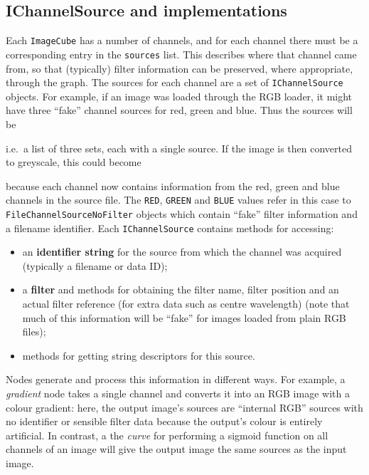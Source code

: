 \subsection{IChannelSource and implementations}
Each \texttt{ImageCube} has a number of channels, and for each channel there must be a corresponding
entry in the \texttt{sources} list. This describes where that channel came from, so that (typically) filter
information can be preserved, where appropriate, through the graph. The sources for each channel are a set
of \texttt{IChannelSource} objects. For example, if an image was loaded through the RGB loader, it might
have three ``fake'' channel sources for red, green and blue. Thus the sources will be 
\begin{v}
\end{v}
i.e.\ a list of three sets, each with a single source.
If the image is then converted to greyscale, this could
become
\begin{v}
\end{v}
because each channel now contains information from the red, green and blue channels in the source file.
The \texttt{RED}, \texttt{GREEN} and \texttt{BLUE} values refer in this case to \texttt{FileChannelSourceNoFilter} objects
which contain ``fake'' filter information and a filename identifier.
Each \texttt{IChannelSource} contains methods for accessing:
\begin{itemize}
\item an \textbf{identifier string} for the source from which the channel was acquired (typically a filename or data ID);
\item a \textbf{filter} and methods for obtaining the filter name, filter position and an actual filter reference (for extra data such as centre wavelength) (note
that much of this information will be ``fake'' for images loaded from plain RGB files);
\item methods for getting string descriptors for this source.
\end{itemize}

Nodes generate and process this information in different ways. For example, a \emph{gradient} node takes a single channel and converts it into an RGB image with
a colour gradient: here, the output image's sources are ``internal RGB'' sources with no identifier or sensible filter data because the output's colour
is entirely artificial. In contrast, a the \emph{curve} for performing a sigmoid function on all channels of an image will give the output image the
same sources as the input image.

